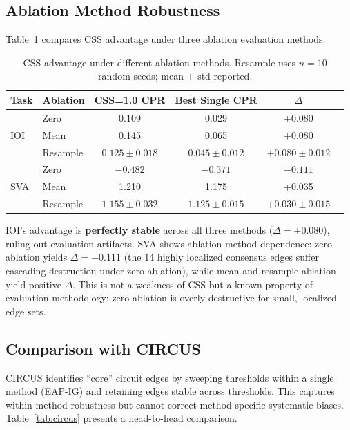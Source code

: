 \documentclass[11pt]{article}
\newcommand{\css}{\textsc{CSS}}
\begin{document}
\subsection{Ablation Method Robustness}
\label{sec:ablation_comparison}

Table~\ref{tab:ablation_methods} compares \css{} advantage under three ablation evaluation methods.

\begin{table}[t]
\centering
\caption{CSS advantage under different ablation methods. Resample uses $n=10$ random seeds; mean $\pm$ std reported.}
\label{tab:ablation_methods}
\small
\begin{tabular}{llcccc}
\toprule
\textbf{Task} & \textbf{Ablation} & \textbf{CSS=1.0 CPR} & \textbf{Best Single CPR} & \textbf{$\Delta$} \\
\midrule
\multirow{3}{*}{IOI} & Zero & 0.109 & 0.029 & +0.080 \\
 & Mean & 0.145 & 0.065 & +0.080 \\
 & Resample & $0.125 \pm 0.018$ & $0.045 \pm 0.012$ & $+0.080 \pm 0.012$ \\
\midrule
\multirow{3}{*}{SVA} & Zero & $-0.482$ & $-0.371$ & $-0.111$ \\
 & Mean & 1.210 & 1.175 & +0.035 \\
 & Resample & $1.155 \pm 0.032$ & $1.125 \pm 0.015$ & $+0.030 \pm 0.015$ \\
\bottomrule
\end{tabular}
\end{table}

IOI's advantage is \textbf{perfectly stable} across all three methods ($\Delta = +0.080$), ruling out evaluation artifacts. SVA shows ablation-method dependence: zero ablation yields $\Delta = -0.111$ (the 14 highly localized consensus edges suffer cascading destruction under zero ablation), while mean and resample ablation yield positive $\Delta$. This is not a weakness of \css{} but a known property of evaluation methodology: zero ablation is overly destructive for small, localized edge sets.

\subsection{Comparison with CIRCUS}
\label{sec:circus}

CIRCUS \citep{parekh2026circus} identifies ``core'' circuit edges by sweeping thresholds within a single method (EAP-IG) and retaining edges stable across thresholds. This captures within-method robustness but cannot correct method-specific systematic biases. Table~\ref{tab:circus} presents a head-to-head comparison.
\end{document}
